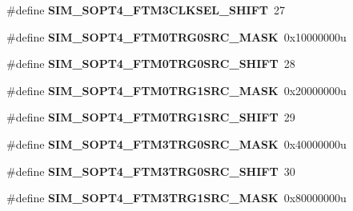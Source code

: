\begin{DoxyCompactItemize}
\item 
\#define {\bfseries S\+I\+M\+\_\+\+S\+O\+P\+T4\+\_\+\+F\+T\+M3\+C\+L\+K\+S\+E\+L\+\_\+\+S\+H\+I\+FT}~27\hypertarget{group__SIM__Register__Masks_ga54a0762662b5e94c962af29aa373c893}{}\label{group__SIM__Register__Masks_ga54a0762662b5e94c962af29aa373c893}

\item 
\#define {\bfseries S\+I\+M\+\_\+\+S\+O\+P\+T4\+\_\+\+F\+T\+M0\+T\+R\+G0\+S\+R\+C\+\_\+\+M\+A\+SK}~0x10000000u\hypertarget{group__SIM__Register__Masks_ga14159dfb09e3ad4c1b9f2f4950a3f4a6}{}\label{group__SIM__Register__Masks_ga14159dfb09e3ad4c1b9f2f4950a3f4a6}

\item 
\#define {\bfseries S\+I\+M\+\_\+\+S\+O\+P\+T4\+\_\+\+F\+T\+M0\+T\+R\+G0\+S\+R\+C\+\_\+\+S\+H\+I\+FT}~28\hypertarget{group__SIM__Register__Masks_ga76c7302a8f939758f0b68fb05ea6dd08}{}\label{group__SIM__Register__Masks_ga76c7302a8f939758f0b68fb05ea6dd08}

\item 
\#define {\bfseries S\+I\+M\+\_\+\+S\+O\+P\+T4\+\_\+\+F\+T\+M0\+T\+R\+G1\+S\+R\+C\+\_\+\+M\+A\+SK}~0x20000000u\hypertarget{group__SIM__Register__Masks_ga427b99978dda3f6bf1c0a97559315276}{}\label{group__SIM__Register__Masks_ga427b99978dda3f6bf1c0a97559315276}

\item 
\#define {\bfseries S\+I\+M\+\_\+\+S\+O\+P\+T4\+\_\+\+F\+T\+M0\+T\+R\+G1\+S\+R\+C\+\_\+\+S\+H\+I\+FT}~29\hypertarget{group__SIM__Register__Masks_gacf67b2d7908669c38dfb06eff3c7fa8a}{}\label{group__SIM__Register__Masks_gacf67b2d7908669c38dfb06eff3c7fa8a}

\item 
\#define {\bfseries S\+I\+M\+\_\+\+S\+O\+P\+T4\+\_\+\+F\+T\+M3\+T\+R\+G0\+S\+R\+C\+\_\+\+M\+A\+SK}~0x40000000u\hypertarget{group__SIM__Register__Masks_gabc6374f1f0ccc17a93f55a32e6eb9c89}{}\label{group__SIM__Register__Masks_gabc6374f1f0ccc17a93f55a32e6eb9c89}

\item 
\#define {\bfseries S\+I\+M\+\_\+\+S\+O\+P\+T4\+\_\+\+F\+T\+M3\+T\+R\+G0\+S\+R\+C\+\_\+\+S\+H\+I\+FT}~30\hypertarget{group__SIM__Register__Masks_gaddc879ce1fd5df4ad46528983ad4480e}{}\label{group__SIM__Register__Masks_gaddc879ce1fd5df4ad46528983ad4480e}

\item 
\#define {\bfseries S\+I\+M\+\_\+\+S\+O\+P\+T4\+\_\+\+F\+T\+M3\+T\+R\+G1\+S\+R\+C\+\_\+\+M\+A\+SK}~0x80000000u\hypertarget{group__SIM__Register__Masks_gad6e00a798bfd9206fe31e2fa2b3a4171}{}\label{group__SIM__Register__Masks_gad6e00a798bfd9206fe31e2fa2b3a4171}


\end{DoxyCompactItemize}
